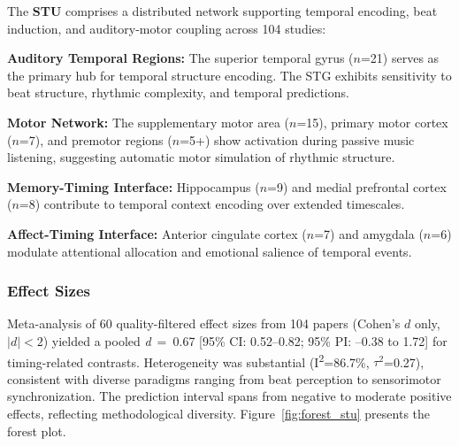 \documentclass[9pt,onecolumn]{article}
\newcommand{\STU}{\textcolor{stucolor}{\textbf{STU}}}
\newcommand{\cohend}[1]{\textit{d}~=~#1}
\newcommand{\Isquared}{I\textsuperscript{2}}
\newcommand{\tausquared}{$\tau^2$}
\begin{document}
The \STU{} comprises a distributed network supporting temporal encoding, beat induction, and auditory-motor coupling across 104 studies:

\textbf{Auditory Temporal Regions:} The superior temporal gyrus ($n$=21) serves as the primary hub for temporal structure encoding. The STG exhibits sensitivity to beat structure, rhythmic complexity, and temporal predictions.

\textbf{Motor Network:} The supplementary motor area ($n$=15), primary motor cortex ($n$=7), and premotor regions ($n$=5+) show activation during passive music listening, suggesting automatic motor simulation of rhythmic structure.

\textbf{Memory-Timing Interface:} Hippocampus ($n$=9) and medial prefrontal cortex ($n$=8) contribute to temporal context encoding over extended timescales.

\textbf{Affect-Timing Interface:} Anterior cingulate cortex ($n$=7) and amygdala ($n$=6) modulate attentional allocation and emotional salience of temporal events.

\subsubsection{Effect Sizes}

Meta-analysis of 60 quality-filtered effect sizes from 104 papers (Cohen's $d$ only, $|d|<2$) yielded a pooled \cohend{0.67} [95\% CI: 0.52--0.82; 95\% PI: --0.38 to 1.72] for timing-related contrasts. Heterogeneity was substantial (\Isquared{}=86.7\%, \tausquared{}=0.27), consistent with diverse paradigms ranging from beat perception to sensorimotor synchronization. The prediction interval spans from negative to moderate positive effects, reflecting methodological diversity. Figure~\ref{fig:forest_stu} presents the forest plot.
\end{document}
